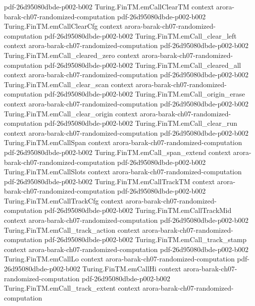 \begin{theorem}
  {pdf-26d95080dbde-p002-b002}
\proofstep
  {Turing.FinTM.emCallClearTM}
  {context}
  {arora-barak-ch07-randomized-computation}
  {pdf-26d95080dbde-p002-b002}
\proofstep
  {Turing.FinTM.emCallClearCfg}
  {context}
  {arora-barak-ch07-randomized-computation}
  {pdf-26d95080dbde-p002-b002}
\proofstep
  {Turing.FinTM.emCall_clear_left}
  {context}
  {arora-barak-ch07-randomized-computation}
  {pdf-26d95080dbde-p002-b002}
\proofstep
  {Turing.FinTM.emCall_cleared_zero}
  {context}
  {arora-barak-ch07-randomized-computation}
  {pdf-26d95080dbde-p002-b002}
\proofstep
  {Turing.FinTM.emCall_cleared_all}
  {context}
  {arora-barak-ch07-randomized-computation}
  {pdf-26d95080dbde-p002-b002}
\proofstep
  {Turing.FinTM.emCall_clear_scan}
  {context}
  {arora-barak-ch07-randomized-computation}
  {pdf-26d95080dbde-p002-b002}
\proofstep
  {Turing.FinTM.emCall_origin_erase}
  {context}
  {arora-barak-ch07-randomized-computation}
  {pdf-26d95080dbde-p002-b002}
\proofstep
  {Turing.FinTM.emCall_clear_origin}
  {context}
  {arora-barak-ch07-randomized-computation}
  {pdf-26d95080dbde-p002-b002}
\proofstep
  {Turing.FinTM.emCall_clear_run}
  {context}
  {arora-barak-ch07-randomized-computation}
  {pdf-26d95080dbde-p002-b002}
\proofstep
  {Turing.FinTM.emCallSpan}
  {context}
  {arora-barak-ch07-randomized-computation}
  {pdf-26d95080dbde-p002-b002}
\proofstep
  {Turing.FinTM.emCall_span_extend}
  {context}
  {arora-barak-ch07-randomized-computation}
  {pdf-26d95080dbde-p002-b002}
\proofstep
  {Turing.FinTM.emCallSlots}
  {context}
  {arora-barak-ch07-randomized-computation}
  {pdf-26d95080dbde-p002-b002}
\proofstep
  {Turing.FinTM.emCallTrackTM}
  {context}
  {arora-barak-ch07-randomized-computation}
  {pdf-26d95080dbde-p002-b002}
\proofstep
  {Turing.FinTM.emCallTrackCfg}
  {context}
  {arora-barak-ch07-randomized-computation}
  {pdf-26d95080dbde-p002-b002}
\proofstep
  {Turing.FinTM.emCallTrackMid}
  {context}
  {arora-barak-ch07-randomized-computation}
  {pdf-26d95080dbde-p002-b002}
\proofstep
  {Turing.FinTM.emCall_track_action}
  {context}
  {arora-barak-ch07-randomized-computation}
  {pdf-26d95080dbde-p002-b002}
\proofstep
  {Turing.FinTM.emCall_track_stamp}
  {context}
  {arora-barak-ch07-randomized-computation}
  {pdf-26d95080dbde-p002-b002}
\proofstep
  {Turing.FinTM.emCallLo}
  {context}
  {arora-barak-ch07-randomized-computation}
  {pdf-26d95080dbde-p002-b002}
\proofstep
  {Turing.FinTM.emCallHi}
  {context}
  {arora-barak-ch07-randomized-computation}
  {pdf-26d95080dbde-p002-b002}
\proofstep
  {Turing.FinTM.emCall_track_extent}
  {context}
  {arora-barak-ch07-randomized-computation}

\end{theorem}
